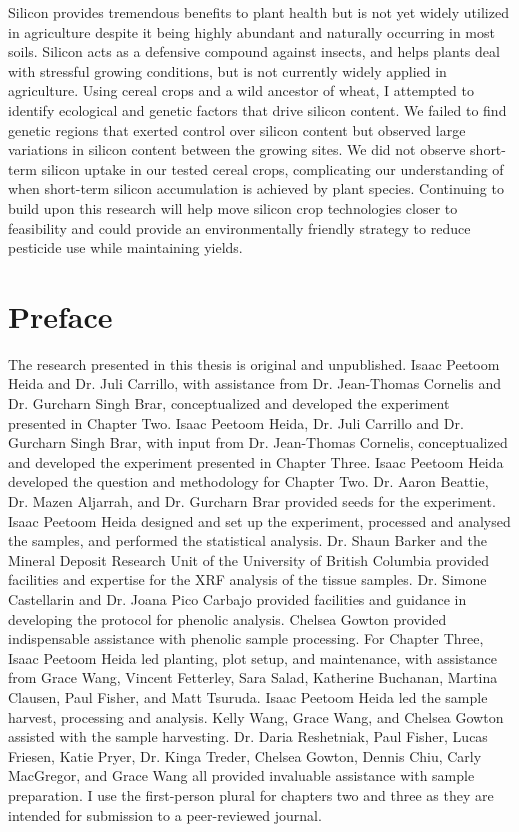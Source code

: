 \documentclass[12pt, letterpaper]{report}
\begin{document}
Silicon provides tremendous benefits to plant health but is not yet widely utilized in agriculture despite it being highly abundant and naturally occurring in most soils. Silicon acts as a defensive compound against insects, and helps plants deal with stressful growing conditions, but is not currently widely applied in agriculture. Using cereal crops and a wild ancestor of wheat, I attempted to identify ecological and genetic factors that drive silicon content.  We failed to find genetic regions that exerted control over silicon content but observed large variations in silicon content between the growing sites. We did not observe short-term silicon uptake in our tested cereal crops, complicating our understanding of when short-term silicon accumulation is achieved by plant species. Continuing to build upon this research will help move silicon crop technologies closer to feasibility and could provide an environmentally friendly strategy to reduce pesticide use while maintaining yields.

\chapter*{Preface}

The research presented in this thesis is original and unpublished. Isaac Peetoom Heida and Dr. Juli Carrillo, with assistance from Dr. Jean-Thomas Cornelis and Dr. Gurcharn Singh Brar, conceptualized and developed the experiment presented in Chapter Two. Isaac Peetoom Heida, Dr. Juli Carrillo and Dr. Gurcharn Singh Brar, with input from Dr. Jean-Thomas Cornelis, conceptualized and developed the experiment presented in Chapter Three.
Isaac Peetoom Heida developed the question and methodology for Chapter Two. Dr. Aaron Beattie, Dr. Mazen Aljarrah, and Dr. Gurcharn Brar provided seeds for the experiment. Isaac Peetoom Heida designed and set up the experiment, processed and analysed the samples, and performed the statistical analysis. Dr. Shaun Barker and the Mineral Deposit Research Unit of the University of British Columbia provided facilities and expertise for the XRF analysis of the tissue samples. Dr. Simone Castellarin and Dr. Joana Pico Carbajo provided facilities and guidance in developing the protocol for phenolic analysis. Chelsea Gowton provided indispensable assistance with phenolic sample processing. 
For Chapter Three, Isaac Peetoom Heida led planting, plot setup, and maintenance, with assistance from Grace Wang, Vincent Fetterley, Sara Salad, Katherine Buchanan, Martina Clausen, Paul Fisher, and Matt Tsuruda. Isaac Peetoom Heida led the sample harvest, processing and analysis. Kelly Wang, Grace Wang, and Chelsea Gowton assisted with the sample harvesting. Dr. Daria Reshetniak, Paul Fisher, Lucas Friesen, Katie Pryer, Dr. Kinga Treder, Chelsea Gowton, Dennis Chiu, Carly MacGregor, and Grace Wang all provided invaluable assistance with sample preparation. 
I use the first-person plural for chapters two and three as they are intended for submission to a peer-reviewed journal. 
\end{document}
